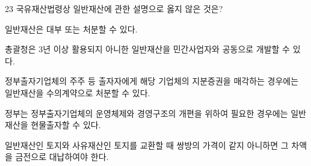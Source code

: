 \begin{question}{23}
국유재산법령상 일반재산에 관한 설명으로 옳지 않은 것은?
\begin{choices}
  \item 일반재산은 대부 또는 처분할 수 있다.
  \item 총괄청은 3년 이상 활용되지 아니한 일반재산을 민간사업자와 공동으로 개발할 수 있다.
  \item 정부출자기업체의 주주 등 출자자에게 해당 기업체의 지분증권을 매각하는 경우에는 일반재산을 수의계약으로 처분할 수 있다.
  \item 정부는 정부출자기업체의 운영체제와 경영구조의 개편을 위하여 필요한 경우에는 일반재산을 현물출자할 수 있다.
  \item 일반재산인 토지와 사유재산인 토지를 교환할 때 쌍방의 가격이 같지 아니하면 그 차액을 금전으로 대납하여야 한다.
\end{choices}
\end{question}

